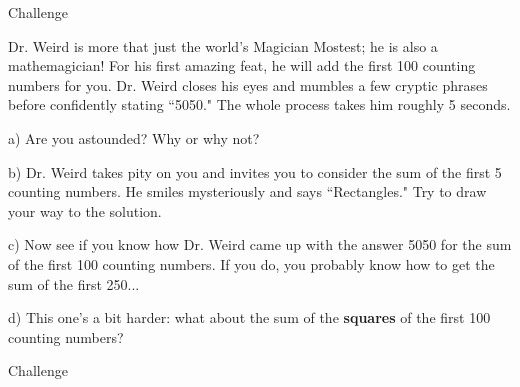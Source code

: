 \begin{tagblock}{Challenge}
\begin{question}[CHALLENGE!!!]
	Dr. Weird is more that just the world's Magician Mostest; he is also a mathemagician! For his first amazing feat, he will add the first 100 counting numbers for you. Dr. Weird closes his eyes and mumbles a few cryptic phrases before confidently stating ``5050." The whole process takes him roughly 5 seconds. 

\bigskip

a) Are you astounded? Why or why not?

\bigskip

b) Dr. Weird takes pity on you and invites you to consider the sum of the first 5 counting numbers. He smiles mysteriously and says ``Rectangles." Try to draw your way to the solution.

\bigskip

c) Now see if you know how Dr. Weird came up with the answer 5050 for the sum of the first 100 counting numbers. If you do, you probably know how to get the sum of the first 250...

\bigskip

d) This one's a bit harder: what about the sum of the \textbf{squares} of the first 100 counting numbers?
	
	
\begin{tags}
	    Challenge
\end{tags}
	
\begin{diary}
\end{diary}
		
\begin{solution}
       
\end{solution}

\end{question}

\end{tagblock}


